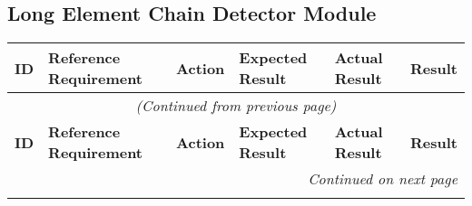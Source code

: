 \documentclass[12pt, titlepage]{article}
\begin{document}
\subsection{Long Element Chain Detector Module}

\begin{longtable}{|c|p{2.5cm}|p{2.5cm}|p{4cm}|p{3cm}|c|}
\hline
\textbf{ID} & \textbf{Reference Requirement} & \textbf{Action} & \textbf{Expected Result} & \textbf{Actual Result} & \textbf{Result} \\ \hline
\endfirsthead

\multicolumn{6}{c}{\textit{(Continued from previous page)}} \\ \hline
\textbf{ID} & \textbf{Reference Requirement} & \textbf{Action} & \textbf{Expected Result} & \textbf{Actual Result} & \textbf{Result} \\ \hline
\endhead

\hline \multicolumn{6}{|r|}{\textit{Continued on next page}} \\ \hline
\endfoot

\hline
\endlastfoot


\end{longtable}
\end{document}
